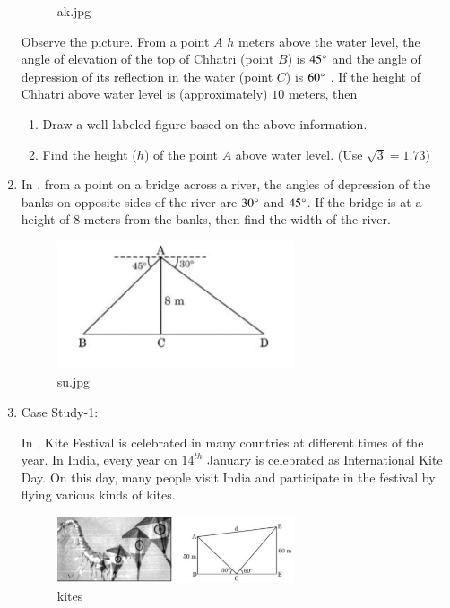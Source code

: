 \begin{enumerate}
\begin{figure}[H]
        \caption{ak.jpg}
        \label{fig:ak}
    \end{figure}
    Observe the picture. From a point $A$ $h$ meters above the water level, the angle of elevation of the top of Chhatri (point $B$) is $45\degree$ and the angle of depression of its reflection in the water (point $C$) is $60\degree$ . If the height of Chhatri above water level is (approximately) $10$ meters, then 
    \begin{enumerate}
        \item Draw a well-labeled figure based on the above information.
        \item Find the height ($h$) of the point $A$ above water level. (Use $\sqrt{3}=1.73$) 
    \end{enumerate}

    \hfill{}\item In , from a point on a bridge across a river, the angles of depression of the banks on opposite sides of the river are $30\degree$ and $45\degree$. If the bridge is at a height of $8$ meters from the banks, then find the width of the river.
    \begin{figure}[H]
        \centering
        \includegraphics[width=70mm]{cbse/figs/su.jpeg}
        \caption{su.jpg}
        \label{fig:su.jpeg}
    \end{figure}
    
    \hfill{}\item Case Study-1:
    
    In , Kite Festival is celebrated in many countries at different times of the year. In India, every year on $14^{th}$ January is celebrated as International Kite Day. On this day, many people visit India and participate in the festival by flying various kinds of kites.
    
    \begin{figure}[H]
	\centering
        \includegraphics[width=70mm]{cbse/figs/kite.jpeg}
        \caption{kites}
        \label{fig:kite.jpeg}
    \end{figure}
    

\end{enumerate}
